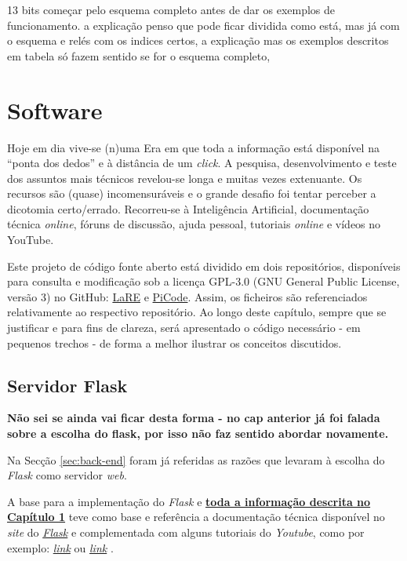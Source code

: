 13 bits começar pelo esquema completo antes de dar os exemplos de funcionamento. a explicação penso que pode ficar dividida como está, mas já com o esquema e relés com os indices certos, a explicação mas os exemplos descritos em tabela só fazem sentido se for o esquema completo,

\section{Software}
\label{sec:implementacaosoftware}
Hoje em dia vive-se (n)uma Era em que toda a informação está disponível na ``ponta dos dedos'' e à distância de um \textit{click}. A pesquisa, desenvolvimento e teste dos assuntos mais técnicos revelou-se longa e muitas vezes extenuante. Os recursos são (quase) incomensuráveis e o grande desafio foi tentar perceber a dicotomia certo/errado. Recorreu-se à Inteligência Artificial, documentação técnica \textit{online}, fóruns de discussão, ajuda pessoal, tutoriais \textit{online} e vídeos no YouTube.

Este projeto de código fonte aberto está dividido em dois repositórios, disponíveis para consulta e modificação sob a licença GPL-3.0 (GNU General Public License, versão 3) no GitHub: \href{https://github.com/eddygrinder/LaRE}{LaRE} e \href{https://github.com/eddygrinder/LaRE_PICode}{PiCode}. Assim, os ficheiros são referenciados relativamente ao respectivo repositório. Ao longo deste capítulo, sempre que se justificar e para fins de clareza, será apresentado o código necessário - em pequenos trechos - de forma a melhor ilustrar os conceitos discutidos.

\subsection{Servidor Flask}
\label{sec:flask}
\textbf{Não sei se ainda vai ficar desta forma - no cap anterior já foi falada sobre a escolha do flask, por isso não faz sentido abordar novamente.}

Na Secção \ref{sec:back-end} foram já referidas as razões que levaram à escolha do \textit{Flask} como servidor \textit{web}. 

A base para a implementação do \textit{Flask} e \underline{\textbf{toda a informação descrita no}} \underline{\textbf{Capítulo \ref{sec:implementacaosoftware}}} teve como base e referência a documentação técnica disponível no \textit{site} do \href{https://flask.palletsprojects.com/en/3.0.x/}{\textit{Flask}} e complementada com alguns tutoriais do \textit{Youtube}, como por exemplo: \href{https://www.youtube.com/watch?v=dam0GPOAvVI}{\textit{link}} ou \href{https://www.youtube.com/watch?v=bB6Yyh7nUl4}{\textit{link}} .

